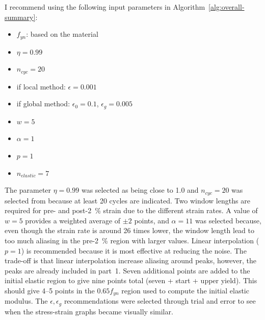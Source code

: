 \documentclass[a4paper,11pt]{article}
\begin{document}
I recommend using the following input parameters in Algorithm~\ref{alg:overall-summary}:
\begin{itemize}
    \item $f_{yn}$: based on the material
    \item $\eta = 0.99$
    \item $n_{cyc} = 20$
    \item if local method: $\epsilon = 0.001$
    \item if global method: $\epsilon_0 = 0.1$, $\epsilon_g = 0.005$
    \item $w = 5$
    \item $\alpha = 1$
    \item $p = 1$
    \item $n_{elastic} = 7$
\end{itemize}
The parameter $\eta = 0.99$ was selected as being close to 1.0 and $n_{cyc} = 20$ was selected from \citet{deCastroeSousaConsistencySolvingInverse2020} because at least 20 cycles are indicated.
Two window lengths are required for pre- and post-2~\% strain due to the different strain rates.
A value of $w = 5$ provides a weighted average of $\pm2$ points, and $\alpha = 11$ was selected because, even though the strain rate is around 26 times lower, the window length lead to too much aliasing in the pre-2~\% region with larger values.
Linear interpolation ($p = 1$) is recommended because it is most effective at reducing the noise.
The trade-off is that linear interpolation increase aliasing around peaks, however, the peaks are already included in part~1.
Seven additional points are added to the initial elastic region to give nine points total (seven + start + upper yield).
This should give 4--5 points in the $0.65 f_{yn}$ region used to compute the initial elastic modulus.
The $\epsilon, \epsilon_g$ recommendations were selected through trial and error to see when the stress-strain graphs became visually similar.
\end{document}
